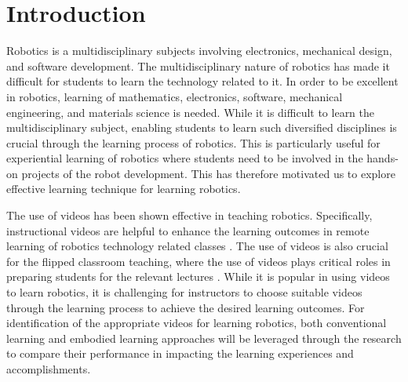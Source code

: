 

\section{Introduction}

\noindent 
Robotics is a multidisciplinary subjects involving electronics, mechanical design, and software development. The multidisciplinary nature of robotics has made it difficult for students to learn the technology related to it. In order to be excellent in robotics, learning of mathematics, electronics, software, mechanical engineering, and materials science is needed. While it is difficult to learn the multidisciplinary subject, enabling students to learn such diversified disciplines is crucial through the learning process of robotics. This is particularly useful for experiential learning of robotics where students need to be involved in the hands-on projects of the robot development. This has therefore motivated us to explore effective learning technique for learning robotics.     



The use of videos has been shown effective in teaching robotics. Specifically, instructional videos are helpful to enhance the learning outcomes in remote learning of robotics technology related classes \cite{eguchi2014robotics,berry2017robotics}. The use of videos is also crucial for the flipped classroom teaching, where the use of videos plays critical roles in preparing students for the relevant lectures \cite{perez2014flipped}.  While it is popular in using videos to learn robotics, it is challenging for instructors to choose suitable videos through the learning process to achieve the desired learning outcomes. For identification of the appropriate videos for learning robotics, both conventional learning and embodied learning approaches will be leveraged through the research to compare their performance in impacting the learning experiences and accomplishments.    

